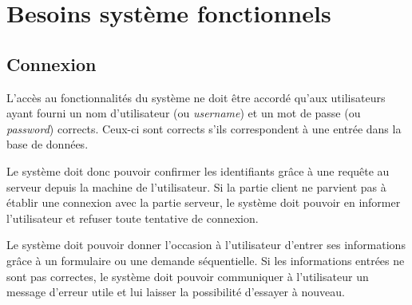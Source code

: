 \section{Besoins système fonctionnels}
\subsection{Connexion}

L'accès au fonctionnalités du système ne doit être accordé
qu'aux utilisateurs ayant fourni un nom d'utilisateur (ou
\emph{username}) et un mot de passe (ou \emph{password})
corrects. Ceux-ci sont corrects s'ils correspondent
 à une entrée dans la base de données.

Le système doit donc pouvoir confirmer les identifiants
grâce à une requête au serveur depuis
la machine de l'utilisateur.
Si la partie client ne parvient pas à établir une connexion
avec la partie serveur,
le système doit pouvoir en informer
l'utilisateur et refuser toute tentative de connexion.

Le système doit pouvoir donner l'occasion à l'utilisateur d'entrer
ses informations grâce à un formulaire ou une demande
séquentielle. Si les informations entrées ne sont pas
correctes, le système doit pouvoir communiquer à
l'utilisateur un message d'erreur utile et lui laisser la
possibilité d'essayer à nouveau.






